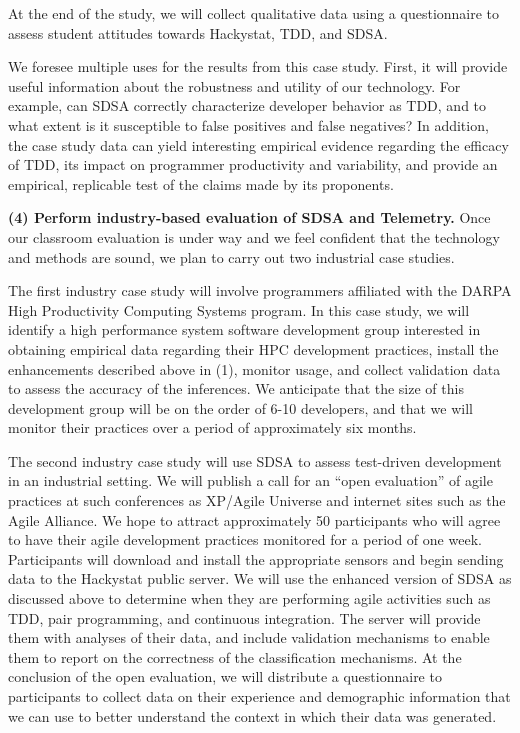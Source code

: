 At the end of the study, we will collect qualitative data using a questionnaire to
assess student attitudes towards Hackystat, TDD, and SDSA.

We foresee multiple uses for the results from this case study.  First, it
will provide useful information about the robustness and utility of our
technology. For example, can SDSA correctly characterize developer behavior
as TDD, and to what extent is it susceptible to false positives and false
negatives? In addition, the case study data can yield interesting empirical
evidence regarding the efficacy of TDD, its impact on programmer
productivity and variability, and provide an empirical, replicable test of
the claims made by its proponents.

{\bf (4) Perform industry-based evaluation of SDSA and Telemetry.}  Once our
classroom evaluation is under way and we feel confident that the technology
and methods are sound, we plan to carry out two industrial case studies.

The first industry case study will involve programmers affiliated with the
DARPA High Productivity Computing Systems program.  In this case study, we
will identify a high performance system software development group
interested in obtaining empirical data regarding their HPC development
practices, install the enhancements described above in (1), monitor usage,
and collect validation data to assess the accuracy of the inferences.  We
anticipate that the size of this development group will be on the order of
6-10 developers, and that we will monitor their practices over a period of
approximately six months.

The second industry case study will use SDSA to assess test-driven
development in an industrial setting.  We will publish a call for an ``open
evaluation'' of agile practices at such conferences as XP/Agile Universe
and internet sites such as the Agile Alliance.  We hope to attract
approximately 50 participants who will agree to have their agile
development practices monitored for a period of one week. Participants will
download and install the appropriate sensors and begin sending data to the
Hackystat public server.  We will use the enhanced version of SDSA as
discussed above to determine when they are performing agile activities such
as TDD, pair programming, and continuous integration.  The server will
provide them with analyses of their data, and include validation mechanisms
to enable them to report on the correctness of the classification
mechanisms.  At the conclusion of the open evaluation, we will distribute a
questionnaire to participants to collect data on their experience and
demographic information that we can use to better understand the context in
which their data was generated.


